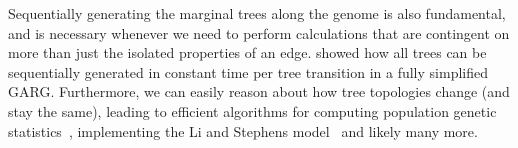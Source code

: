 \documentclass{article}
\begin{document}
Sequentially generating the marginal trees along the genome
is also fundamental, and is necessary whenever we need to
perform calculations that are contingent on more than just the
isolated properties of an edge. \cite{kelleher2016efficient}
showed how all trees can be sequentially generated in
constant time per tree transition in a fully simplified GARG.
Furthermore, we can easily reason about how tree topologies
change (and stay the same), leading to efficient algorithms
for computing population genetic
statistics~\citep{kelleher2016efficient,kelleher2018efficient},
implementing the Li and Stephens
model~\citep{kelleher2019inferring,wohns2021unified}
and likely many more.





\end{document}
